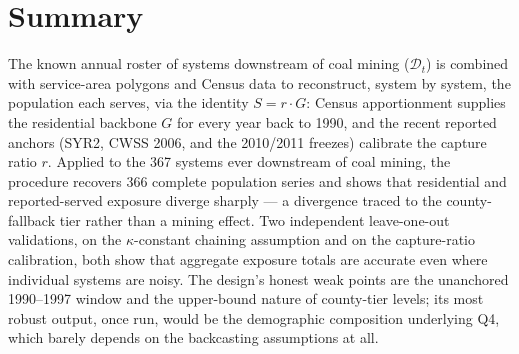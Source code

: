 \documentclass[11pt]{article}
\begin{document}
\section*{Summary}

The known annual roster of systems downstream of coal mining ($\mathcal{D}_t$)
is combined with service-area polygons and Census data to reconstruct, system
by system, the population each serves, via the identity $S=r\cdot G$: Census
apportionment supplies the residential backbone $G$ for every year back to
1990, and the recent reported anchors (SYR2, CWSS 2006, and the 2010/2011
freezes) calibrate the capture ratio $r$. Applied to the 367 systems ever
downstream of coal mining, the procedure recovers 366 complete population
series and shows that residential and reported-served exposure diverge
sharply --- a divergence traced to the county-fallback tier rather than a
mining effect. Two independent leave-one-out validations, on the $\kappa$-constant
chaining assumption and on the capture-ratio calibration, both show that
aggregate exposure totals are accurate even where individual systems are
noisy. The design's honest weak points are the unanchored 1990--1997 window
and the upper-bound nature of county-tier levels; its most robust output,
once run, would be the demographic composition underlying Q4, which barely
depends on the backcasting assumptions at all.
\end{document}
